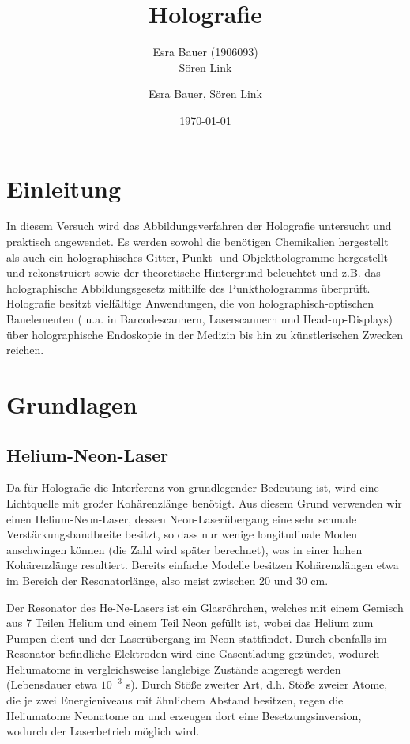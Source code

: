 \documentclass[bigchapter,colorback,accentcolor=tud4b,linedtoc,11pt]{tudreport}
\title{Holografie}
\subtitle{Esra Bauer (1906093) \\Sören Link}
\author{Esra Bauer, Sören Link}
\date{\today}
\begin{document}

\maketitle

\tableofcontents


\chapter{Einleitung}

In diesem Versuch wird das Abbildungsverfahren der Holografie untersucht und praktisch angewendet. Es werden sowohl die benötigen Chemikalien hergestellt als auch ein holographisches Gitter, Punkt- und Objekthologramme hergestellt und rekonstruiert sowie der theoretische Hintergrund beleuchtet und z.B. das holographische Abbildungsgesetz mithilfe des Punkthologramms überprüft. Holografie besitzt vielfältige Anwendungen, die von holographisch-optischen Bauelementen ( u.a. in Barcodescannern, Laserscannern und Head-up-Displays) über holographische Endoskopie in der Medizin bis hin zu künstlerischen Zwecken reichen.

\chapter{Grundlagen}

\section{Helium-Neon-Laser}

Da für Holografie die Interferenz von grundlegender Bedeutung ist, wird eine Lichtquelle mit großer Kohärenzlänge benötigt. Aus diesem Grund verwenden wir einen Helium-Neon-Laser, dessen Neon-Laserübergang eine sehr schmale Verstärkungsbandbreite besitzt, so dass nur wenige longitudinale Moden anschwingen können (die Zahl wird später berechnet), was in einer hohen Kohärenzlänge resultiert. Bereits einfache Modelle besitzen Kohärenzlängen etwa im Bereich der Resonatorlänge, also meist zwischen 20 und 30 cm.

Der Resonator des He-Ne-Lasers ist ein Glasröhrchen, welches mit einem Gemisch aus 7 Teilen Helium und einem Teil Neon gefüllt ist, wobei das Helium zum Pumpen dient und der Laserübergang im Neon stattfindet. Durch ebenfalls im Resonator befindliche Elektroden wird eine Gasentladung gezündet, wodurch Heliumatome in vergleichsweise langlebige Zustände angeregt werden (Lebensdauer etwa $10 ^{-3}$ s). Durch Stöße zweiter Art, d.h. Stöße zweier Atome, die je zwei Energieniveaus mit ähnlichem Abstand besitzen, regen die Heliumatome Neonatome an und erzeugen dort eine Besetzungsinversion, wodurch der Laserbetrieb möglich wird.
\end{document}
